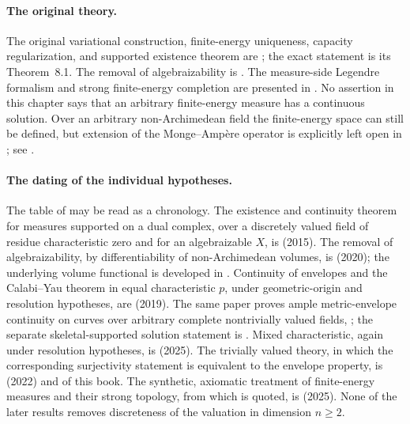 \enlargethispage{2\baselineskip}

\paragraph{The original theory.}
The original variational construction, finite-energy uniqueness, capacity
regularization, and supported existence theorem are
\cite[\S\S6--8]{BFJ15}; the exact statement is its Theorem~8.1.  The
removal of algebraizability is \cite{BGGJKM20}.  The measure-side Legendre
formalism and strong finite-energy completion are presented in
\cite{BJ25FiniteEnergy}.  No assertion in this chapter says that an
arbitrary finite-energy measure has a continuous solution.
Over an arbitrary non-Archimedean field the finite-energy space can still be
defined, but extension of the Monge--Amp\`ere operator is explicitly left
open in \cite[Remark~4.4]{PS23Hybrid}; see
.

\paragraph{The dating of the individual hypotheses.}
The table of  may be read as a chronology.  The
existence and continuity theorem for measures supported on a dual complex,
over a discretely valued field of residue characteristic zero and for an
algebraizable $X$, is \cite{BFJ15} (2015).  The removal of
algebraizability, by differentiability of non-Archimedean volumes, is
\cite[Theorem~6.3.3 and Corollary~6.3.4]{BGGJKM20} (2020); the underlying
volume functional is developed in \cite{BGM21}.  Continuity of envelopes and
the Calabi--Yau theorem in equal characteristic $p$, under geometric-origin
and resolution hypotheses, are \cite[Theorems~1.4, 8.2, 9.2 and~9.3]{GJKM19}
(2019).  The same paper proves ample metric-envelope continuity on
curves over arbitrary complete nontrivially valued fields,
\cite[Theorem~1.1]{GJKM19}; the separate skeletal-supported solution
statement is .
Mixed characteristic,
again under resolution hypotheses, is \cite{FGK25} (2025).  The trivially
valued theory, in which the corresponding surjectivity statement is
equivalent to the envelope property, is \cite[\S\S7--12]{BJ22} (2022) and
 of this book.  The synthetic, axiomatic treatment of
finite-energy measures and their strong topology, from which
 is quoted, is
\cite{BJ25FiniteEnergy} (2025).  None of the later results removes
discreteness of the valuation in dimension $n\geq2$.

